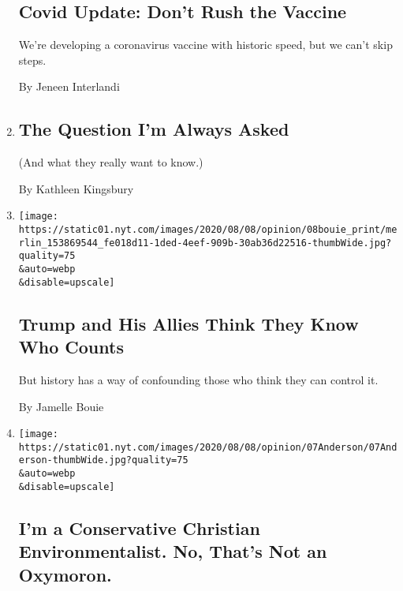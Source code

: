 \begin{enumerate}
{  \subsection{Covid Update: Don't Rush the
  Vaccine}\label{covid-update-dont-rush-the-vaccine}}

  We're developing a coronavirus vaccine with historic speed, but we
  can't skip steps.

  By Jeneen Interlandi
\item
  \href{/2020/08/07/opinion/the-question-im-always-asked.html}{}

  \hypertarget{the-question-im-always-asked}{%
  \subsection{The Question I'm Always
  Asked}\label{the-question-im-always-asked}}

  (And what they really want to know.)

  By Kathleen Kingsbury
\item
  \href{/2020/08/07/opinion/trump-2020-census.html}{}

  \texttt{[image: https://static01.nyt.com/images/2020/08/08/opinion/08bouie\_print/merlin\_153869544\_fe018d11-1ded-4eef-909b-30ab36d22516-thumbWide.jpg?quality=75\\\&auto=webp\\\&disable=upscale]}

  \hypertarget{trump-and-his-allies-think-they-know-who-counts-1}{%
  \subsection{Trump and His Allies Think They Know Who
  Counts}\label{trump-and-his-allies-think-they-know-who-counts-1}}

  But history has a way of confounding those who think they can control
  it.

  By Jamelle Bouie
\item
  \href{/2020/08/07/opinion/republicans-climate-change.html}{}

  \texttt{[image: https://static01.nyt.com/images/2020/08/08/opinion/07Anderson/07Anderson-thumbWide.jpg?quality=75\\\&auto=webp\\\&disable=upscale]}

  \hypertarget{im-a-conservative-christian-environmentalist-no-thats-not-an-oxymoron}{%
  \subsection{I'm a Conservative Christian Environmentalist. No, That's
  Not an
  Oxymoron.}\label{im-a-conservative-christian-environmentalist-no-thats-not-an-oxymoron}}


\end{enumerate}
